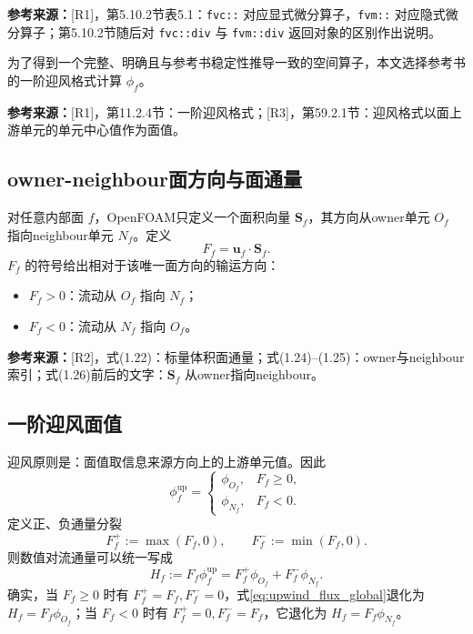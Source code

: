 \documentclass[UTF8,12pt,a4paper]{ctexart}
\numberwithin{equation}{section}
\newcommand{\Rone}{\textnormal{[R1]}}
\newcommand{\Rtwo}{\textnormal{[R2]}}
\newcommand{\Rthree}{\textnormal{[R3]}}
\newcommand{\source}[1]{%
  \par\smallskip
  \noindent\colorbox{sourcebg}{%
    \parbox{0.955\linewidth}{\footnotesize\color{sourcegray}\textbf{参考来源：}#1}%
  }
  \par\smallskip
}
\begin{document}
\source{\Rone，第5.10.2节表5.1：\texttt{fvc::} 对应显式微分算子，\texttt{fvm::} 对应隐式微分算子；第5.10.2节随后对 \texttt{fvc::div} 与 \texttt{fvm::div} 返回对象的区别作出说明。}

为了得到一个完整、明确且与参考书稳定性推导一致的空间算子，本文选择参考书的一阶迎风格式计算 $\phi_f$。

\source{\Rone，第11.2.4节：一阶迎风格式；\Rthree，第59.2.1节：迎风格式以面上游单元的单元中心值作为面值。}

\subsection{owner-neighbour面方向与面通量}

对任意内部面 $f$，OpenFOAM只定义一个面积向量 $\bm S_f$，其方向从owner单元 $O_f$ 指向neighbour单元 $N_f$。定义
\begin{equation}
  F_f=\bm u_f\cdot\bm S_f.
  \label{eq:global_face_flux}
\end{equation}
$F_f$ 的符号给出相对于该唯一面方向的输运方向：
\begin{itemize}
  \item $F_f>0$：流动从 $O_f$ 指向 $N_f$；
  \item $F_f<0$：流动从 $N_f$ 指向 $O_f$。
\end{itemize}

\source{\Rtwo，式(1.22)：标量体积面通量；式(1.24)--(1.25)：owner与neighbour索引；式(1.26)前后的文字：$\bm S_f$ 从owner指向neighbour。}

\subsection{一阶迎风面值}

迎风原则是：面值取信息来源方向上的上游单元值。因此
\begin{equation}
  \boxed{
  \phi_f^{\mathrm{up}}=
  \begin{cases}
    \phi_{O_f}, & F_f\ge0,\\[1mm]
    \phi_{N_f}, & F_f<0.
  \end{cases}
  }
  \label{eq:upwind_piecewise}
\end{equation}
定义正、负通量分裂
\begin{equation}
  F_f^+:=\max(F_f,0),
  \qquad
  F_f^-:=\min(F_f,0).
  \label{eq:flux_split}
\end{equation}
则数值对流通量可以统一写成
\begin{equation}
  \boxed{
  H_f:=F_f\phi_f^{\mathrm{up}}
  =F_f^+\phi_{O_f}+F_f^-\phi_{N_f}
  }.
  \label{eq:upwind_flux_global}
\end{equation}
确实，当 $F_f\ge0$ 时有 $F_f^+=F_f,F_f^-=0$，式\eqref{eq:upwind_flux_global}退化为 $H_f=F_f\phi_{O_f}$；当 $F_f<0$ 时有 $F_f^+=0,F_f^-=F_f$，它退化为 $H_f=F_f\phi_{N_f}$。
\end{document}
